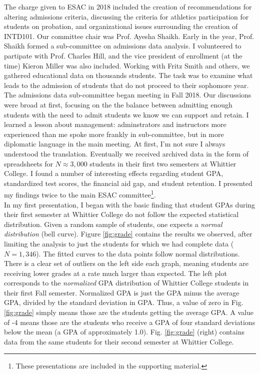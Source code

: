 \documentclass[../../../main.tex]{subfiles}
\begin{document}
The charge given to ESAC in 2018 included the creation of recommendations for altering admissions criteria, discussing the criteria for athletics participation for students on probation, and organizational issues surrounding the creation of INTD101.  Our committee chair was Prof. Ayesha Shaikh.  Early in the year, Prof. Shaikh formed a sub-committee on admissions data analysis.  I volunteered to partipate with Prof. Charles Hill, and the vice president of enrollment (at the time) Kieron Miller was also included.  Working with Fritz Smith and others, we gathered educational data on thousands students.  The task was to examine what leads to the admission of students that do not proceed to their sophomore year.
\\
\vspace{0.25cm}
The admissions data sub-committee began meeting in Fall 2018.  Our discussions were broad at first, focusing on the the balance between admitting enough students with the need to admit students we know we can support and retain.  I learned a lesson about management: adminstrators and instructors more experienced than me spoke more frankly in sub-committee, but in more diplomatic language in the main meeting.  At first, I'm not sure I always understood the translation.  Eventually we received archived data in the form of spreadsheets for $N \approx 3,000$ students in their first two semesters at Whittier College.  I found a number of interesting effects regarding student GPA, standardized test scores, the financial aid gap, and student retention.  I presented my findings twice to the main ESAC committee\footnote{These presentations are included in the supporting material.}.
\\
\vspace{0.15cm}
In my first presentation, I began with the basic finding that student GPAs during their first semester at Whittier College do not follow the expected statistical distribution.  Given a random sample of students, one expects a \textit{normal distribution} (bell curve).  Figure \ref{fig:grade} contains the results we observed, after limiting the analysis to just the students for which we had complete data ($N = 1,346$).  The fitted curves to the data points follow normal distributions.  There is a clear set of outliers on the left side each graph, meaning students are receiving lower grades at a rate much larger than expected.  The left plot corresponds to the \textit{normalized} GPA distribution of Whittier College students in their first Fall semester.  Normalized GPA is just the GPA minus the average GPA, divided by the standard deviation in GPA.  Thus, a value of zero in Fig. \ref{fig:grade} simply means those are the students getting the average GPA.  A value of -4 means those are the students who receive a GPA of four standard deviations below the mean (a GPA of approximately 1.0).  Fig. \ref{fig:grade} (right) contains data from the same students for their second semester at Whittier College.
\\
\vspace{0.15cm}
\end{document}
